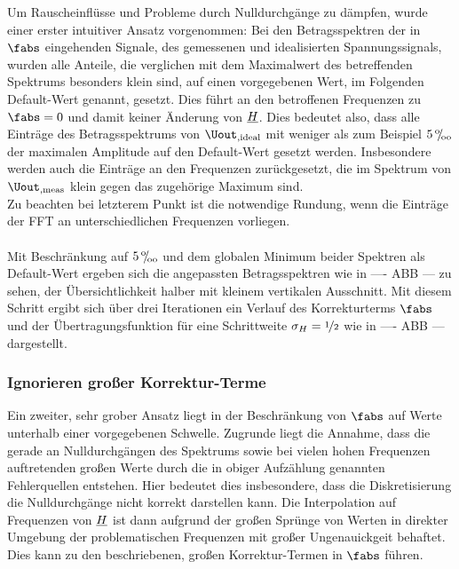 \documentclass[../Report.tex]{subfiles}
\begin{document}
Um Rauscheinflüsse und Probleme durch Nulldurchgänge zu dämpfen, wurde einer erster intuitiver Ansatz vorgenommen: Bei den Betragsspektren der in $\fabs$ eingehenden Signale, des gemessenen und idealisierten Spannungssignals, wurden alle Anteile, die verglichen mit dem Maximalwert des betreffenden Spektrums besonders klein sind, auf einen vorgegebenen Wert, im Folgenden Default-Wert genannt, gesetzt. Dies führt an den betroffenen Frequenzen zu $\fabs = 0$ und damit keiner Änderung von $\underline{H}$.
Dies bedeutet also, dass alle Einträge des Betragsspektrums von $\Uout_{,\mathrm{ideal}}$ mit weniger als zum Beispiel $5 \, {}^\text{o}\mkern-5mu/\mkern-3mu_\text{oo} $ der maximalen Amplitude auf den Default-Wert gesetzt werden. Insbesondere werden auch die Einträge an den Frequenzen zurückgesetzt, die im Spektrum von $\Uout_{,\mathrm{meas}}$ klein gegen das zugehörige Maximum sind.
\\
Zu beachten bei letzterem Punkt ist die notwendige Rundung, wenn die Einträge der FFT an unterschiedlichen Frequenzen vorliegen. 
\\
\\
\indent
Mit Beschränkung auf $5 \, {}^\text{o}\mkern-5mu/\mkern-3mu_\text{oo}$ und dem globalen Minimum beider Spektren als Default-Wert ergeben sich die angepassten Betragsspektren wie in ---- ABB --- zu sehen, der Übersichtlichkeit halber mit kleinem vertikalen Ausschnitt.
Mit diesem Schritt ergibt sich über drei Iterationen ein Verlauf des Korrekturterms $\fabs$ und der Übertragungsfunktion für eine Schrittweite $\sigma_H = \nicefrac{1}{2}$ wie in ---- ABB --- dargestellt. 


\subsubsection*{Ignorieren großer Korrektur-Terme}
\label{subsubsec:opt.H.RMS}

Ein zweiter, sehr grober Ansatz liegt in der Beschränkung von $\fabs$ auf Werte unterhalb einer vorgegebenen Schwelle. Zugrunde liegt die Annahme, dass die gerade an Nulldurchgängen des Spektrums sowie bei vielen hohen Frequenzen auftretenden großen Werte durch die in obiger Aufzählung genannten Fehlerquellen entstehen. Hier bedeutet dies insbesondere, dass die Diskretisierung die Nulldurchgänge nicht korrekt darstellen kann. Die Interpolation auf Frequenzen von $\underline{H}$ ist dann aufgrund der großen Sprünge von Werten in direkter Umgebung der problematischen Frequenzen mit großer Ungenauickgeit behaftet. Dies kann zu den beschriebenen, großen Korrektur-Termen in $\fabs$ führen.
\end{document}
